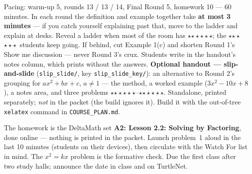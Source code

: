 \documentclass[10pt]{article}
\newcommand{\rung}[1]{{\color{goldacc}\ifcase#1\or$\star$\or$\star\star$\or$\star\star\star$\fi}}
\begin{document}
\begin{teachernote}[Slides]
Pacing: warm-up 5, rounds 13 / 13 / 14, Final Round 5, homework 10 --- 60 minutes. In each
round the definition and example together take \textbf{at most 3 minutes} --- if you catch
yourself explaining past that, move to the ladder and explain at desks. Reveal a ladder when
most of the room has \rung2; the \rung3\ students keep going. If behind, cut Example 1(c) and
shorten Round 1's Show me discussion --- never Round 3's crux. Students write in the handout's
notes column, which prints without the answers.
\textbf{Optional handout --- slip-and-slide} (\texttt{slip\_slide/}, key \texttt{slip\_slide\_key/}):
an alternative to Round 2's grouping for $ax^2+bx+c$, $a\ne1$ --- the method, a worked example
($3x^2-10x+8$), a notes area, and three problems \rung1--\rung3. Standalone, printed separately;
\emph{not} in the packet (the build ignores it). Build it with the out-of-tree \texttt{xelatex}
command in \texttt{COURSE\_PLAN.md}.
\end{teachernote}

\begin{teachernote}[Homework]
The homework is the DeltaMath set \textbf{A2: Lesson 2.2: Solving by Factoring}, done online --- nothing is
printed in the packet. Launch problem~1 aloud in the last 10 minutes (students on their
devices), then circulate with the Watch For list in mind. The $x^2=kx$ problem is the formative
check. Due the first class after two study halls; announce the date in class and on TurtleNet.
\end{teachernote}
\end{document}
